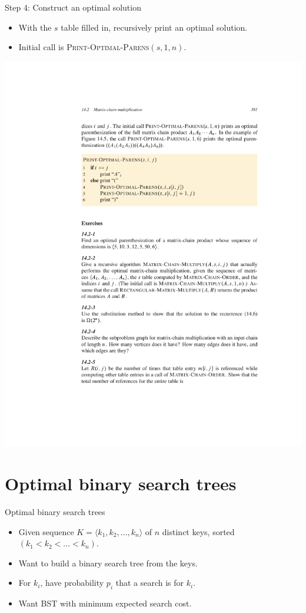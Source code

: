 \documentclass[aspectratio=169]{beamer}
\begin{document}
\begin{frame}{Step 4: Construct an optimal solution}
    \begin{itemize}
        \item With the $s$ table filled in, recursively print an optimal solution.
        \item Initial call is \textsc{Print-Optimal-Parens}$(s, 1, n)$.
    \end{itemize}
    \centering
    \includegraphics[width=\textwidth, trim={4cm 17cm 5cm 6.75cm}, clip]{figures/p381}
\end{frame}

\section{Optimal binary search trees}

\begin{frame}{Optimal binary search trees}
    \begin{itemize}
        \item Given sequence $K = \langle k_1, k_2, \ldots, k_n \rangle$ of $n$ distinct keys, sorted $(k_1 < k_2 < \ldots < k_n)$.
        \item Want to build a binary search tree from the keys.
        \item For $k_i$, have probability $p_i$ that a search is for $k_i$.
        \item Want BST with minimum expected search cost.
    \end{itemize}
\end{frame}
\end{document}
